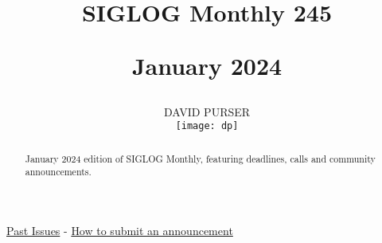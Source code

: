 \documentclass[prodmode,acmtecs]{acmsmall} %
\newcounter{colstart}
\begin{document}
\setcounter{colstart}{\thepage}

\title{{\huge\sc SIGLOG Monthly 245}

 January 2024}
\author{DAVID PURSER
\vspace*{-2.6cm}\begin{flushright}\texttt{[image: dp]}\end{flushright}
}

\begin{abstract}
January 2024 edition of SIGLOG Monthly, featuring deadlines, calls and community announcements.
\end{abstract}


\maketitlee

\href{https://lics.siglog.org/newsletters/}{Past Issues}
 - 
\href{https://lics.siglog.org/newsletters/inst.html}{How to submit an announcement}
\end{document}
